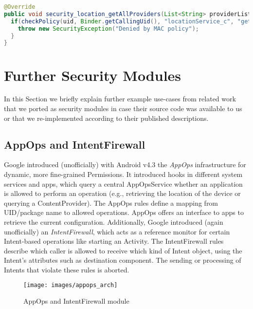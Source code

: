 \documentclass[letterpaper,twocolumn,10pt]{article}
\begin{document}
\begin{lstlisting}[language=Java,basicstyle=\footnotesize,caption={Re-implementation of the hook from Listing~\ref{listing:flaskdroidorig} in a security module},label={listing:flaskdroidreimplementation},aboveskip=\medskipamount,belowskip=\medskipamount]
@Override
public void security_location_getAllProviders(List<String> providerList, int uid, int pid) {
  if(checkPolicy(uid, Binder.getCallingUid(), "locationService_c", "getAllProviders") == PackageManager.PERMISSION_DENIED) {
    throw new SecurityException("Denied by MAC policy");
  }
}
\end{lstlisting}



\section{Further Security Modules}
\label{sec:appendix:furtherusecases}

In this Section we briefly explain further example use-cases from related work that we ported as security modules in case their source code was available to us or that we re-implemented according to their published descriptions.

\subsection{AppOps and IntentFirewall}
\label{sec:usecase:appops}

Google introduced (unofficially) with Android v4.3 the \textit{AppOps} infrastructure for dynamic, more fine-grained Permissions. It introduced hooks in different system services and apps, which query a central AppOpsService whether an application is allowed to perform an operation (e.g., retrieving the location of the device or querying a ContentProvider). The AppOps rules define a mapping from UID/package name to allowed operations. AppOps offers an interface to apps to retrieve the current configuration. Additionally, Google introduced (again unofficially) an \textit{IntentFirewall}, which acts as a reference monitor for certain Intent-based operations like starting an Activity. The IntentFirewall rules describe which caller is allowed to receive which kind of Intent object, using the Intent's attributes such as destination component. The sending or processing of Intents that violate these rules is aborted.

\begin{figure}[h]
  \centering
  \texttt{[image: images/appops\_arch]}
  \caption{AppOps and IntentFirewall module}
  \label{fig:appopsmodule}
\end{figure}
\end{document}
